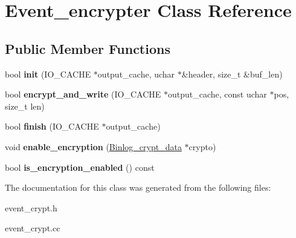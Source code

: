 \hypertarget{classEvent__encrypter}{}\section{Event\+\_\+encrypter Class Reference}
\label{classEvent__encrypter}
\subsection*{Public Member Functions}
\begin{DoxyCompactItemize}
\item 
\mbox{\label{classEvent__encrypter_ac28fb3e9f739eadfcfad8036836cc04a}} 
bool {\bfseries init} (I\+O\+\_\+\+C\+A\+C\+HE $\ast$output\+\_\+cache, uchar $\ast$\&header, size\+\_\+t \&buf\+\_\+len)
\item 
\mbox{\label{classEvent__encrypter_a59191741e577413e6615868775072f9c}} 
bool {\bfseries encrypt\+\_\+and\+\_\+write} (I\+O\+\_\+\+C\+A\+C\+HE $\ast$output\+\_\+cache, const uchar $\ast$pos, size\+\_\+t len)
\item 
\mbox{\label{classEvent__encrypter_abc00b5fc3e593cdc5c06ae65fecc27bf}} 
bool {\bfseries finish} (I\+O\+\_\+\+C\+A\+C\+HE $\ast$output\+\_\+cache)
\item 
\mbox{\label{classEvent__encrypter_a37b5660c30b84931683c35b80a9ba572}} 
void {\bfseries enable\+\_\+encryption} (\mbox{\hyperlink{classBinlog__crypt__data}{Binlog\+\_\+crypt\+\_\+data}} $\ast$crypto)
\item 
\mbox{\label{classEvent__encrypter_ade89463cc0cfadaed35b231660196433}} 
bool {\bfseries is\+\_\+encryption\+\_\+enabled} () const
\end{DoxyCompactItemize}


The documentation for this class was generated from the following files\+:\begin{DoxyCompactItemize}
\item 
event\+\_\+crypt.\+h\item 
event\+\_\+crypt.\+cc\end{DoxyCompactItemize}
